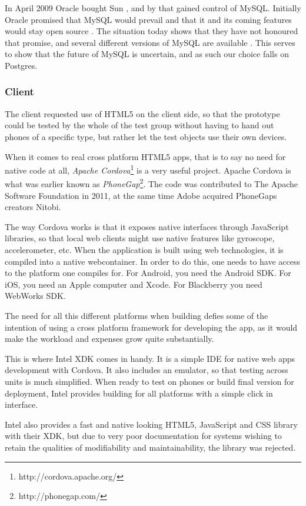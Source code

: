 \documentclass[11pt]{book}
\begin{document}
In April 2009 Oracle bought Sun \cite{sun}, and by that gained control of MySQL. Initially Oracle promised that MySQL would prevail and that it and its coming features would stay open source \cite{mysql}. The situation today shows that they have not honoured that promise, and several different versions of MySQL are available \cite{mysqlproducts}. This serves to show that the future of MySQL is uncertain, and as such our choice falls on Postgres.

\subsubsection{Client}
The client requested use of HTML5 on the client side, so that the prototype could be tested by the whole of the test group without having to hand out phones of a specific type, but rather let the test objects use their own devices.

When it comes to real cross platform HTML5 apps, that is to say no need for native code at all, \emph{Apache Cordova}\footnote{http://cordova.apache.org/} is a very useful project. Apache Cordova is what was earlier known as \emph{PhoneGap}\footnote{http://phonegap.com/}.\cite{phonegap} The code was contributed to The Apache Software Foundation in 2011, at the same time Adobe acquired PhoneGaps creators Nitobi.

The way Cordova works is that it exposes native interfaces through JavaScript libraries, so that local web clients might use native features like gyroscope, accelerometer, etc. When the application is built using web technologies, it is compiled into a native webcontainer. In order to do this, one needs to have access to the platform one compiles for. For Android, you need the Android SDK. For iOS, you need an Apple computer and Xcode. For Blackberry you need WebWorks SDK.

The need for all this different platforms when building defies some of the intention of using a cross platform framework for developing the app, as it would make the workload and expenses grow quite substantially.

This is where Intel XDK comes in handy. It is a simple IDE for native web apps development with Cordova. It also includes an emulator, so that testing across units is much simplified. When ready to test on phones or build final version for deployment, Intel provides building for all platforms with a simple click in interface.

Intel also provides a fast and native looking HTML5, JavaScript and CSS library with their XDK, but due to very poor documentation for systems wishing to retain the qualities of modifiability and maintainability, the library was rejected.
\end{document}
